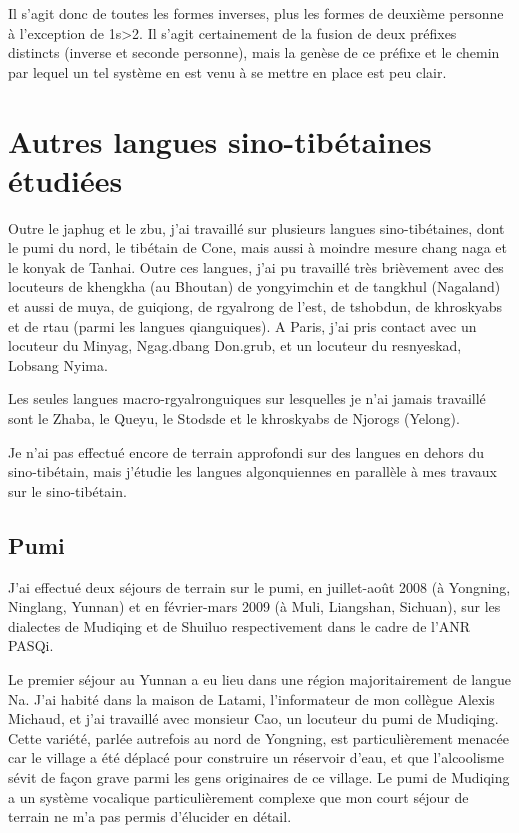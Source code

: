\documentclass[oldfontcommands,oneside,a4paper,11pt]{memoir}
\begin{document}
Il s'agit donc de toutes les formes inverses, plus les formes de deuxième personne à l'exception de 1s>2. Il s'agit certainement de la fusion de deux préfixes distincts (inverse et seconde personne), mais la genèse de ce préfixe et le chemin  par lequel un tel système en est venu à se mettre en place est peu clair.

\section{Autres langues sino-tibétaines étudiées} 
Outre le japhug et le zbu, j'ai travaillé sur plusieurs langues sino-tibétaines, dont le pumi du nord, le tibétain de Cone, mais aussi à moindre mesure chang naga et le konyak de Tanhai. Outre ces langues, j'ai pu travaillé très brièvement avec des locuteurs de khengkha (au Bhoutan) de yongyimchin et de tangkhul (Nagaland) et aussi de muya, de guiqiong, de rgyalrong de l'est, de tshobdun, de khroskyabs et de rtau (parmi les langues qianguiques). A Paris, j'ai pris contact avec un locuteur du Minyag, Ngag.dbang Don.grub, et un locuteur du resnyeskad, Lobsang Nyima.

Les seules langues macro-rgyalronguiques sur lesquelles je n'ai jamais travaillé sont le Zhaba, le Queyu, le Stodsde et le khroskyabs de Njorogs (Yelong).


Je n'ai pas effectué encore de terrain approfondi sur des langues en dehors du sino-tibétain, mais j'étudie les langues algonquiennes en parallèle à mes travaux sur le sino-tibétain.

\subsection{Pumi}
J'ai effectué deux séjours de terrain sur le pumi, en juillet-août 2008 (à Yongning, Ninglang, Yunnan) et en février-mars 2009 (à Muli, Liangshan, Sichuan), sur les dialectes de Mudiqing et de Shuiluo respectivement dans le cadre de l'ANR PASQi. 

Le premier séjour au Yunnan a eu lieu dans une région majoritairement de langue Na. J'ai habité dans la maison de Latami, l'informateur de mon collègue Alexis Michaud, et j'ai travaillé avec monsieur Cao, un locuteur du pumi de Mudiqing. Cette variété, parlée autrefois au nord de Yongning, est particulièrement menacée car le village a été déplacé pour construire un réservoir d'eau, et que l'alcoolisme sévit de façon grave parmi les gens originaires de ce village. Le pumi de Mudiqing a un système vocalique particulièrement complexe que mon court séjour de terrain ne m'a pas permis d'élucider en détail.
\end{document}
